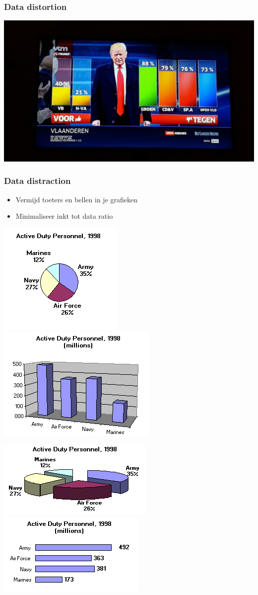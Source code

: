 \documentclass{beamer}
\begin{document}
\begin{frame}
  \frametitle{Data distortion}

  \begin{center}
    \includegraphics[width=.8\textwidth]{img/les2-03-2}
  \end{center}
\end{frame}

\begin{frame}
  \frametitle{Data distraction}

  \begin{itemize}
    \item Vermijd toeters en bellen in je grafieken
    \item Minimaliseer inkt tot data ratio
  \end{itemize}

  \centering
  \includegraphics[width=.4\textwidth]{img/les2-04}
  \includegraphics[width=.4\textwidth]{img/les2-05}

  \includegraphics[width=.4\textwidth]{img/les2-06}
  \includegraphics[width=.4\textwidth]{img/les2-07}
\end{frame}
\end{document}
